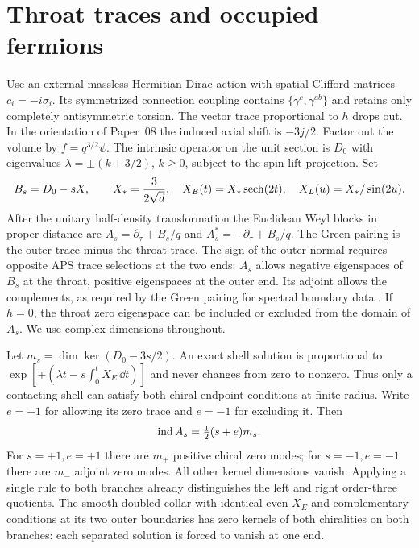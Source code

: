 \section{Throat traces and occupied fermions}\label{sec:states}
Use an external massless Hermitian Dirac action with spatial Clifford matrices $c_i=-i\sigma_i$. Its symmetrized connection coupling contains $\{\gamma^c,\gamma^{ab}\}$ and retains only completely antisymmetric torsion. The vector trace proportional to $h$ drops out. In the orientation of Paper~08 the induced axial shift is $-3j/2$. Factor out the volume by $f=q^{3/2}\psi$. The intrinsic operator on the unit section is $D_0$ with eigenvalues $\lambda=\pm(k+3/2)$, $k\ge0$, subject to the spin-lift projection. Set
\begin{equation}
 B_s=D_0-sX,\qquad X_*=\frac{3}{2\sqrt d},\quad
 X_E(t)=X_*\operatorname{sech}(2t),\quad X_L(u)=X_*/\sin(2u).
 \label{eq:X}
\end{equation}
After the unitary half-density transformation the Euclidean Weyl blocks in proper distance are $A_s=\partial_\tau+B_s/q$ and $A_s^*=-\partial_\tau+B_s/q$. The Green pairing is the outer trace minus the throat trace. The sign of the outer normal requires opposite APS trace selections at the two ends: $A_s$ allows negative eigenspaces of $B_s$ at the throat, positive eigenspaces at the outer end. Its adjoint allows the complements, as required by the Green pairing for spectral boundary data \cite{BB}. If $h=0$, the throat zero eigenspace can be included or excluded from the domain of $A_s$. We use complex dimensions throughout.

Let $m_s=\dim\ker(D_0-3s/2)$. An exact shell solution is proportional to $\exp[\mp(\lambda t-s\int_0^t X_E\,\dd t)]$ and never changes from zero to nonzero. Thus only a contacting shell can satisfy both chiral endpoint conditions at finite radius. Write $e=+1$ for allowing its zero trace and $e=-1$ for excluding it. Then
\begin{equation}
 \operatorname{ind} A_s=\tfrac12(s+e)m_s .
 \label{eq:index}
\end{equation}
For $s=+1,e=+1$ there are $m_+$ positive chiral zero modes; for $s=-1,e=-1$ there are $m_-$ adjoint zero modes. All other kernel dimensions vanish. Applying a single rule to both branches already distinguishes the left and right order-three quotients. The smooth doubled collar with identical even $X_E$ and complementary conditions at its two outer boundaries has zero kernels of both chiralities on both branches: each separated solution is forced to vanish at one end.


